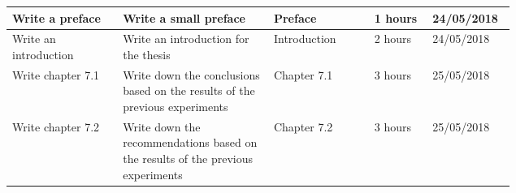 \begin{longtable}{| p{0.22\linewidth} | p{0.3\linewidth}| p{0.2\linewidth} | l | l |}
Write a preface & Write a small preface & Preface & 1 hours & 24/05/2018 \\
\hline

Write an introduction & Write an introduction for the thesis & Introduction & 2 hours & 24/05/2018 \\
\hline

Write chapter 7.1 & Write down the conclusions based on the results of the previous experiments & Chapter 7.1 & 3 hours & 25/05/2018 \\
\hline

Write chapter 7.2 & Write down the recommendations based on the results of the previous experiments & Chapter 7.2 & 3 hours & 25/05/2018 \\
\hline

\end{longtable}
\newpage


